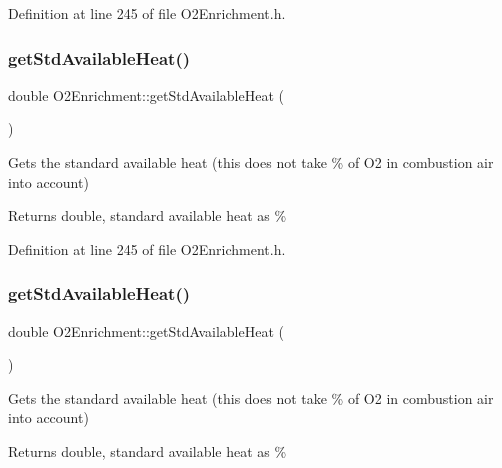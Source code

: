 Definition at line 245 of file O2\+Enrichment.\+h.

\mbox{\label{class_o2_enrichment_a6eab50d08baaca010d208139cb99d239}} 
\subsubsection{\texorpdfstring{get\+Std\+Available\+Heat()}{getStdAvailableHeat()}\hspace{0.1cm}{\footnotesize\ttfamily [2/3]}}
{\footnotesize\ttfamily double O2\+Enrichment\+::get\+Std\+Available\+Heat (\begin{DoxyParamCaption}{ }\end{DoxyParamCaption})\hspace{0.3cm}{\ttfamily [inline]}}

Gets the standard available heat (this does not take \% of O2 in combustion air into account) \begin{DoxyReturn}{Returns}
double, standard available heat as \% 
\end{DoxyReturn}


Definition at line 245 of file O2\+Enrichment.\+h.

\mbox{\label{class_o2_enrichment_a6eab50d08baaca010d208139cb99d239}} 
\subsubsection{\texorpdfstring{get\+Std\+Available\+Heat()}{getStdAvailableHeat()}\hspace{0.1cm}{\footnotesize\ttfamily [3/3]}}
{\footnotesize\ttfamily double O2\+Enrichment\+::get\+Std\+Available\+Heat (\begin{DoxyParamCaption}{ }\end{DoxyParamCaption})\hspace{0.3cm}{\ttfamily [inline]}}

Gets the standard available heat (this does not take \% of O2 in combustion air into account) \begin{DoxyReturn}{Returns}
double, standard available heat as \% 
\end{DoxyReturn}


